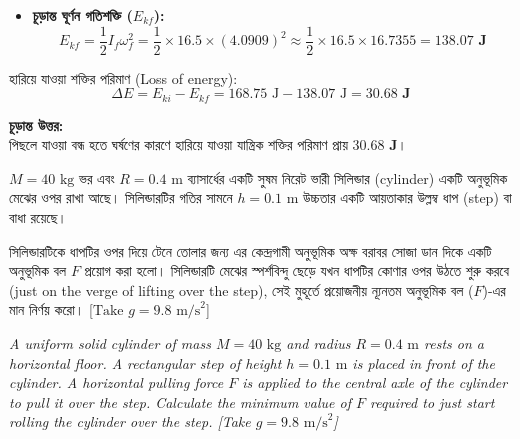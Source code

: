\documentclass[12pt, a4paper]{article}
\begin{document}
\begin{tcolorbox}[solutionbox={সমাধান (Solution)}]
\begin{itemize}[leftmargin=*, parsep=0.4ex]
    \item \textbf{চূড়ান্ত ঘূর্ণন গতিশক্তি ($E_{kf}$):}
    $$E_{kf} = \frac{1}{2} I_f \omega_f^2 = \frac{1}{2} \times 16.5 \times (4.0909)^2 \approx \frac{1}{2} \times 16.5 \times 16.7355 = \mathbf{138.07\text{ J}}$$
\end{itemize}

হারিয়ে যাওয়া শক্তির পরিমাণ (Loss of energy): 
$$\Delta E = E_{ki} - E_{kf} = 168.75\text{ J} - 138.07\text{ J} = \mathbf{30.68\text{ J}}$$

\vspace{1em}
\begin{tcolorbox}[answerbox]
\textbf{চূড়ান্ত উত্তর:} \\
পিছলে যাওয়া বন্ধ হতে ঘর্ষণের কারণে হারিয়ে যাওয়া যান্ত্রিক শক্তির পরিমাণ প্রায় $\mathbf{30.68\text{ J}}$।
\end{tcolorbox}
\end{tcolorbox}

\begin{tcolorbox}[questionbox={প্রশ্ন (Question)11}]
\noindent
$M = 40\text{ kg}$ ভর এবং $R = 0.4\text{ m}$ ব্যাসার্ধের একটি সুষম নিরেট ভারী সিলিন্ডার (cylinder) একটি অনুভূমিক মেঝের ওপর রাখা আছে। সিলিন্ডারটির গতির সামনে $h = 0.1\text{ m}$ উচ্চতার একটি আয়তাকার উল্লম্ব ধাপ (step) বা বাধা রয়েছে। 

\vspace{0.3em}
\noindent
সিলিন্ডারটিকে ধাপটির ওপর দিয়ে টেনে তোলার জন্য এর কেন্দ্রগামী অনুভূমিক অক্ষ বরাবর সোজা ডান দিকে একটি অনুভূমিক বল $F$ প্রয়োগ করা হলো। সিলিন্ডারটি মেঝের স্পর্শবিন্দু ছেড়ে যখন ধাপটির কোণার ওপর উঠতে শুরু করবে (just on the verge of lifting over the step), সেই মুহূর্তে প্রয়োজনীয় ন্যূনতম অনুভূমিক বল ($F$)-এর মান নির্ণয় করো। [$\text{Take } g = 9.8\text{ m/s}^2$]

\vspace{0.8em}
\begin{english}
\noindent\textit{\color{darkgray}
A uniform solid cylinder of mass $M = 40\text{ kg}$ and radius $R = 0.4\text{ m}$ rests on a horizontal floor. A rectangular step of height $h = 0.1\text{ m}$ is placed in front of the cylinder. A horizontal pulling force $F$ is applied to the central axle of the cylinder to pull it over the step. Calculate the minimum value of $F$ required to just start rolling the cylinder over the step. [Take $g = 9.8\text{ m/s}^2$]
}
\end{english}
\end{tcolorbox}
\end{document}
